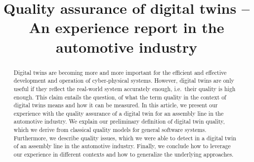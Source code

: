\documentclass[9pt,conference]{IEEEtran}
\begin{document}
    \title{Quality assurance of digital twins -- An experience report in the automotive industry}
    \author{
        \and
    }
    \maketitle

    \begin{abstract}
        Digital twins are becoming more and more important for the efficient and effective development and operation of cyber-physical systems.
        However, digital twins are only useful if they reflect the real-world system accurately enough, i.e.\ their quality is high enough.
        This claim entails the question, of what the term quality in the context of digital twins means and how it can be measured.
        In this article, we present our experience with the quality assurance of a digital twin for an assembly line in the automotive industry.
        We explain our preliminary definition of digital twin quality, which we derive from classical quality models for general software systems.
        Furthermore, we describe quality issues, which we were able to detect in a digital twin of an assembly line in the automotive industry.
        Finally, we conclude how to leverage our experience in different contexts and how to generalize the underlying approaches.
    \end{abstract}
\end{document}
